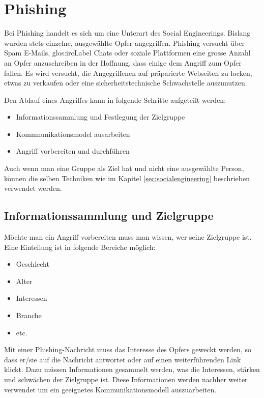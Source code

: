 \setcounter{secnumdepth}{3}
\chapter{Phishing}
Bei Phishing handelt es sich um eine Unterart des Social Engineerings. Bislang wurden stets einzelne, ausgewählte Opfer angegriffen.
Phishing versucht über Spam E-Mails, \Gls{glos:ircLabel} Chats oder soziale Plattformen eine grosse Anzahl an Opfer anzuschreiben in der Hoffnung, dass einige dem Angriff zum Opfer fallen. Es wird versucht, die Angegriffenen auf präparierte Webseiten zu locken, etwas zu verkaufen oder eine sicherheitstechnische Schwachstelle auszunutzen.

Den Ablauf eines Angriffes kann in folgende Schritte aufgeteilt werden:
\begin{itemize}
\item Informationssammlung und Festlegung der Zielgruppe
\item Kommnunikationsmodel ausarbeiten
\item Angriff vorbereiten und durchführen
\end{itemize}

Auch wenn man eine Gruppe als Ziel hat und nicht eine ausgewählte Person, können die selben Techniken wie im Kapitel \ref{sec:socialengineering}  beschrieben verwendet werden.

\section{Informationssammlung und Zielgruppe}
Möchte man ein Angriff vorbereiten muss man wissen, wer seine Zielgruppe ist. Eine Einteilung ist in folgende Bereiche möglich:
\begin{itemize}
\item Geschlecht
\item Alter
\item Interessen
\item Branche
\item etc.
\end{itemize}

Mit einer Phishing-Nachricht muss das Interesse des Opfers geweckt werden, so dass er/sie auf die Nachricht antwortet oder auf einen weiterführenden Link klickt. Dazu müssen Informationen gesammelt werden, was die Interessen, stärken und schwächen der Zielgruppe ist. Diese Informationen werden nachher weiter verwendet um ein geeignetes Kommunikationsmodell auszuarbeiten.

